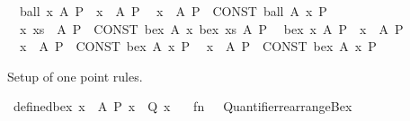 \begin{isabellebody}
\ \ {\isachardoublequoteopen}{\isacharunderscore}{\kern0pt}ball{}\ x\ A\ P{\isachardoublequoteclose}\ {\isasymrightharpoonup}\ {\isachardoublequoteopen}{\isasymforall}x\ {\isasymin}\ A{\isachardot}{\kern0pt}\ P{\isachardoublequoteclose}\isanewline
\ \ {\isachardoublequoteopen}{\isasymforall}x\ {\isasymin}\ A{\isachardot}{\kern0pt}\ P{\isachardoublequoteclose}\ {\isasymrightleftharpoons}\ {\isachardoublequoteopen}CONST\ ball\ A\ {\isacharparenleft}{\kern0pt}{\isasymlambda}x{\isachardot}{\kern0pt}\ P{\isacharparenright}{\kern0pt}{\isachardoublequoteclose}\isanewline
\isanewline
\ \ {\isachardoublequoteopen}{\isasymexists}x\ xs\ {\isasymin}\ A{\isachardot}{\kern0pt}\ P{\isachardoublequoteclose}\ {\isasymrightharpoonup}\ {\isachardoublequoteopen}CONST\ bex\ A\ {\isacharparenleft}{\kern0pt}{\isasymlambda}x{\isachardot}{\kern0pt}\ {\isacharunderscore}{\kern0pt}bex{}\ xs\ A\ P{\isacharparenright}{\kern0pt}{\isachardoublequoteclose}\isanewline
\ \ {\isachardoublequoteopen}{\isacharunderscore}{\kern0pt}bex{}\ x\ A\ P{\isachardoublequoteclose}\ {\isasymrightharpoonup}\ {\isachardoublequoteopen}{\isasymexists}x\ {\isasymin}\ A{\isachardot}{\kern0pt}\ P{\isachardoublequoteclose}\isanewline
\ \ {\isachardoublequoteopen}{\isasymexists}x\ {\isasymin}\ A{\isachardot}{\kern0pt}\ P{\isachardoublequoteclose}\ {\isasymrightleftharpoons}\ {\isachardoublequoteopen}CONST\ bex\ A\ {\isacharparenleft}{\kern0pt}{\isasymlambda}x{\isachardot}{\kern0pt}\ P{\isacharparenright}{\kern0pt}{\isachardoublequoteclose}\isanewline
\isanewline
\ \ {\isachardoublequoteopen}{\isasymexists}{\isacharbang}{\kern0pt}x\ {\isasymin}\ A{\isachardot}{\kern0pt}\ P{\isachardoublequoteclose}\ {\isasymrightleftharpoons}\ {\isachardoublequoteopen}CONST\ bex{}\ A\ {\isacharparenleft}{\kern0pt}{\isasymlambda}x{\isachardot}{\kern0pt}\ P{\isacharparenright}{\kern0pt}{\isachardoublequoteclose}%
\begin{isamarkuptext}%
Setup of one point rules.%
\end{isamarkuptext}\isamarkuptrue%
%
\isadelimML
%
\endisadelimML
%
\isatagML
{}\isamarkupfalse%
\ defined{\isacharunderscore}{\kern0pt}bex\ {\isacharparenleft}{\kern0pt}{\isachardoublequoteopen}{\isasymexists}x\ {\isasymin}\ A{\isachardot}{\kern0pt}\ P\ x\ {\isasymand}\ Q\ x{\isachardoublequoteclose}{\isacharparenright}{\kern0pt}\ {\isacharequal}{\kern0pt}\isanewline
\ \ {\isacartoucheopen}fn\ {\isacharunderscore}{\kern0pt}\ {\isacharequal}{\kern0pt}{\isachargreater}{\kern0pt}\ Quantifier{}{\isachardot}{\kern0pt}rearrange{\isacharunderscore}{\kern0pt}Bex\isanewline

\end{isabellebody}
